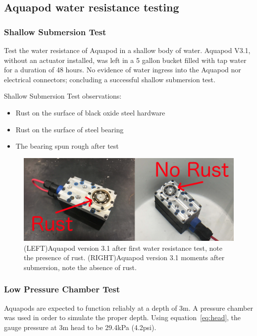 

\subsection{Aquapod water resistance testing}


\subsubsection{Shallow Submersion Test}
Test the water resistance of Aquapod in a shallow body of water.
Aquapod V3.1, without an actuator installed, was left in a 5 gallon bucket filled with tap water for a duration of 48 hours. 
No evidence of water ingress into the Aquapod nor electrical connectors; concluding a successful shallow submersion test.

Shallow Submersion Test observations:
\begin{itemize}
    \item Rust on the surface of black oxide steel hardware
    
    \item Rust on the surface of steel bearing

    \item The bearing spun rough after test

\end{itemize}

\begin{figure}[h]
\centering
\includegraphics[width=1.0\columnwidth]{img/rust.png}
\caption{(LEFT)Aquapod version 3.1 after first water resistance test, note the presence of rust.  (RIGHT)Aquapod version 3.1 moments after submersion, note the absence of rust.}
\label{fig:pod in bucket}\label{fig:pod rust}
\end{figure}





\subsubsection{Low Pressure Chamber Test}
Aquapods are expected to function reliably at a depth of 3m. A pressure chamber was used in order to simulate the proper depth. Using equation~\ref{eq:head}, the gauge pressure at 3m head to be 29.4kPa (4.2psi).

